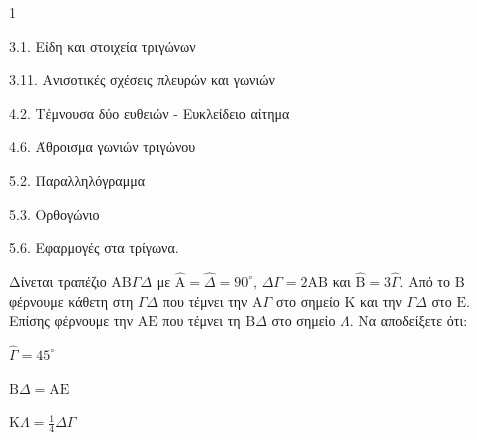 \begin{ylh}{1}
    \item 3.1. Είδη και στοιχεία τριγώνων
    \item 3.11. Ανισοτικές σχέσεις πλευρών και γωνιών
    \item 4.2. Τέμνουσα δύο ευθειών - Ευκλείδειο αίτημα
    \item 4.6. Άθροισμα γωνιών τριγώνου
    \item 5.2. Παραλληλόγραμμα
    \item 5.3. Ορθογώνιο
    \item 5.6. Εφαρμογές στα τρίγωνα.
\end{ylh}
Δίνεται τραπέζιο $\mathrm{A}\mathrm{B}\Gamma\Delta$ με $\hat{\mathrm{A}} = \hat{\Delta} = 90^\circ$, $\Delta\Gamma = 2\mathrm{A}\mathrm{B}$ και $\hat{\mathrm{B}} = 3\hat{\Gamma}$. Από το $\mathrm{B}$ φέρνουμε κάθετη στη $\Gamma\Delta$ που τέμνει την $\mathrm{A}\Gamma$ στο σημείο $\mathrm{K}$ και την $\Gamma\Delta$ στο $\mathrm{E}$. Επίσης φέρνουμε την $\mathrm{A}\mathrm{E}$ που τέμνει τη $\mathrm{B}\Delta$ στο σημείο $\Lambda$.
Να αποδείξετε ότι:
\begin{alist}
    \item $\hat{\Gamma} = 45^\circ$ 
    \item $\mathrm{B}\Delta = \mathrm{A}\mathrm{E}$ 
    \item $\mathrm{K}\Lambda = \frac{1}{4}\Delta\Gamma$ 
\end{alist}
